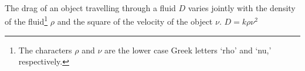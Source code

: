 {The drag of an object travelling through a fluid $D$ varies jointly with the density of the fluid\footnote{The characters $\rho$ and $\nu$ are the lower case Greek letters `rho' and `nu,' respectively.} $\rho$ and the square of the velocity of the object $\nu$.}
{$D = k \rho \nu^2$}